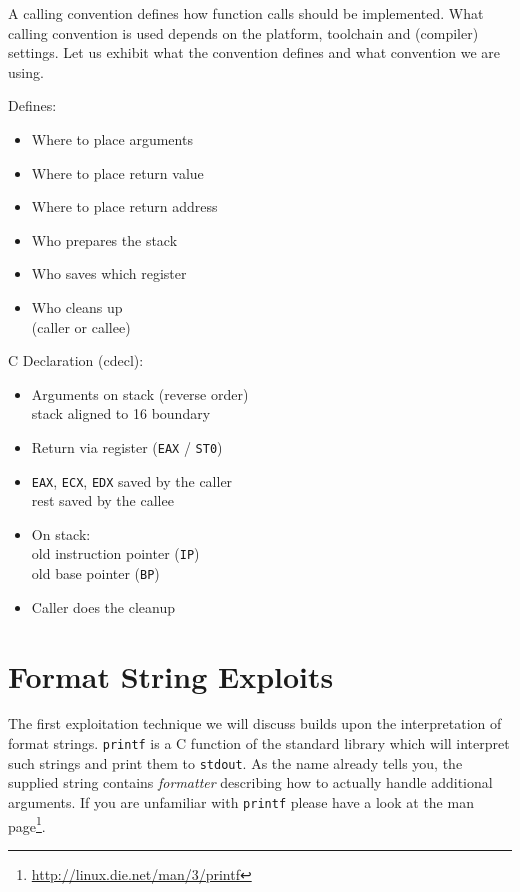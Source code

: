\documentclass[article]{uibk}
\begin{document}
A calling convention defines how function calls should be implemented. What
calling convention is used depends on the platform, toolchain and (compiler)
settings. Let us exhibit what the convention defines and what convention we are
using.

\begin{minipage}[t]{0.47\textwidth}
    Defines:
    \begin{itemize}
        \item Where to place arguments
        \item Where to place return value
        \item Where to place return address
        \item Who prepares the stack
        \item Who saves which register
        \item Who cleans up\\
            (caller or callee)
    \end{itemize}
\end{minipage}
\begin{minipage}[t]{0.47\textwidth}
    C Declaration (cdecl):
    \begin{itemize}
        \item Arguments on stack (reverse order)\\
            stack aligned to \SI{16}{\byte} boundary
        \item Return via register (\texttt{EAX} / \texttt{ST0})
        \item \texttt{EAX}, \texttt{ECX}, \texttt{EDX} saved by the caller\\
            rest saved by the callee
        \item On stack:\\
            old instruction pointer (\texttt{IP})\\
            old base pointer (\texttt{BP})
        \item Caller does the cleanup
    \end{itemize}
\end{minipage}

\section{Format String Exploits}

The first exploitation technique we will discuss builds upon the interpretation
of format strings. \texttt{printf} is a C function of the standard library
which will interpret such strings and print them to \texttt{stdout}. As the
name already tells you, the supplied string contains \textit{formatter}
describing how to actually handle additional arguments. If you are unfamiliar
with \texttt{printf} please have a look at the man
page\footnote{\url{http://linux.die.net/man/3/printf}}.
\end{document}
